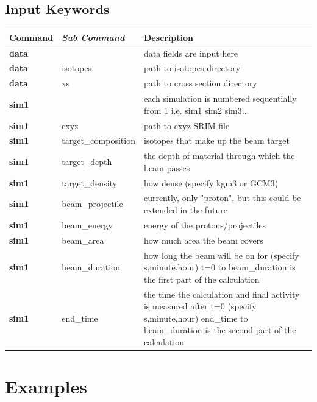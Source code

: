\documentclass[12pt,twoside]{manual}
\begin{document}
\FloatBarrier


\section{Input Keywords}

\begin{tabular}{p{3cm}p{3cm}p{7cm}}
\textbf{Command} & \textbf{\textit{Sub Command}} & Description \\
\hline
\textbf{data} &  & data fields are input here \\
\textbf{data} & isotopes & path to isotopes directory \\
\textbf{data} & xs & path to cross section directory \\
\textbf{sim1} &  & each simulation is numbered sequentially from 1 i.e. sim1 sim2 sim3... \\
\textbf{sim1} & exyz & path to exyz SRIM file \\
\textbf{sim1} & target\_composition & isotopes that make up the beam target \\
\textbf{sim1} & target\_depth & the depth of material through which the beam passes \\
\textbf{sim1} & target\_density & how dense (specify kgm3 or GCM3) \\
\textbf{sim1} & beam\_projectile & currently, only "proton", but this could be extended in the future \\
\textbf{sim1} & beam\_energy & energy of the protons/projectiles \\
\textbf{sim1} & beam\_area & how much area the beam covers \\
\textbf{sim1} & beam\_duration & how long the beam will be on for (specify s,minute,hour) t=0 to beam\_duration is the first part of the calculation \\
\textbf{sim1} & end\_time & the time the calculation and final activity is measured after t=0 (specify s,minute,hour) end\_time to beam\_duration is the second part of the calculation \\

\end{tabular}





\FloatBarrier


\chapter{Examples}
\end{document}

